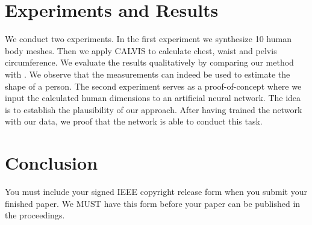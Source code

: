 \documentclass[10pt,twocolumn,letterpaper]{article}
\begin{document}
 

\section{Experiments and Results}

We conduct two experiments. In the first experiment we synthesize 10 human body 
meshes. Then we apply CALVIS to calculate chest, waist and pelvis 
circumference. We evaluate the results qualitatively by comparing our method 
with \cite{Dibra.2016b}. We observe that the 
measurements can indeed be used to estimate the shape of a person. The second 
experiment serves as a proof-of-concept where we input the calculated human 
dimensions to an artificial neural network. The idea is to establish the 
plausibility of our approach. After having trained the network with our data, 
we proof that the network is able to conduct this task.


\section{Conclusion}

You must include your signed IEEE copyright release form when you submit
your finished paper. We MUST have this form before your paper can be
published in the proceedings.

{\small


}
\end{document}
